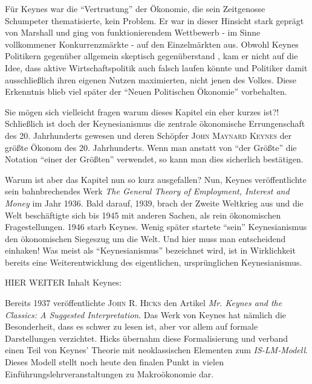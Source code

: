 Für Keynes war die "`Vertrustung"' der Ökonomie, die sein Zeitgenosse Schumpeter thematisierte, kein Problem. Er war in dieser Hinsicht stark geprägt von Marshall und ging von funktionierendem Wettbewerb - im Sinne vollkommener Konkurrenzmärkte - auf den Einzelmärkten aus. 
Obwohl Keynes Politikern gegenüber allgemein skeptisch gegenüberstand \parencite[S. 291]{Scherf1989}, kam er nicht auf die Idee, dass aktive Wirtschaftspolitik auch falsch laufen könnte und Politiker damit ausschließlich ihren eigenen Nutzen maximierten, nicht jenen des Volkes. Diese Erkenntnis blieb viel später der "`Neuen Politischen Ökonomie"' vorbehalten. 




Sie mögen sich vielleicht fragen warum dieses Kapitel ein eher kurzes ist?! Schließlich ist doch der Keynesianismus die zentrale ökonomische Errungenschaft des 20. Jahrhunderts gewesen und deren Schöpfer \textsc{John Maynard Keynes} der größte Ökonom des 20. Jahrhunderts. Wenn man anstatt von "`der Größte"' die Notation "`einer der Größten"' verwendet, so kann man dies sicherlich bestätigen.

Warum ist aber das Kapitel nun so kurz ausgefallen? Nun, Keynes veröffentlichte sein bahnbrechendes Werk \textit{The General Theory of Employment, Interest and Money} im Jahr 1936. Bald darauf, 1939, brach der Zweite Weltkrieg aus und die Welt beschäftigte sich bis 1945 mit anderen Sachen, als rein ökonomischen Fragestellungen. 1946 starb Keynes. Wenig später startete "`sein"' Keynesianismus den ökonomischen Siegeszug um die Welt. Und hier muss man entscheidend einhaken! Was meist als "`Keynesianismus"' bezeichnet wird, ist in Wirklichkeit bereits eine Weiterentwicklung des eigentlichen, ursprünglichen Keynesianismus.

HIER WEITER
Inhalt Keynes:






Bereits 1937 veröffentlichte \textsc{John R. Hicks} den Artikel \textit{Mr. Keynes and the Classics: A Suggested Interpretation}. Das Werk von Keynes hat nämlich die Besonderheit, dass es schwer zu lesen ist, aber vor allem auf formale Darstellungen verzichtet. Hicks übernahm diese Formalisierung und verband einen Teil von Keynes' Theorie mit neoklassischen Elementen zum \textit{IS-LM-Modell}. Dieses Modell stellt noch heute den finalen Punkt in vielen Einführungslehrveranstaltungen zu Makroökonomie dar.

